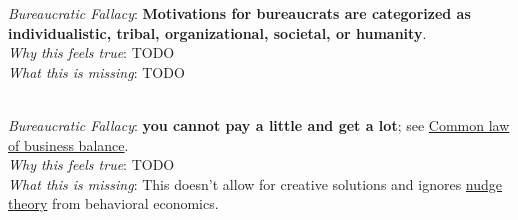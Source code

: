 \textit{Bureaucratic Fallacy}: \textbf{Motivations for bureaucrats are categorized as individualistic, tribal, organizational, societal, or humanity}.\\
\textit{Why this feels true}: TODO\\
\textit{What this is missing}: TODO


\ \\

\textit{Bureaucratic Fallacy}: 
\textbf{you cannot pay a little and get a lot}; see \href{https://en.wikipedia.org/wiki/Common_law_of_business_balance}{Common law of business balance}. \\
\textit{Why this feels true}: TODO\\
\textit{What this is missing}: This doesn't allow for creative solutions and ignores \href{https://en.wikipedia.org/wiki/Nudge_theory}{nudge theory} from behavioral economics. 

